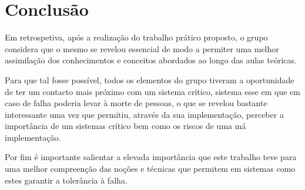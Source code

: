 \chapter*{Conclusão}
\label{cha:conclusao}
Em retrospetiva, após a realização do trabalho prático proposto, o grupo considera que o mesmo se revelou essencial de
modo a permiter uma melhor assimilação dos conhecimentos e conceitos abordados ao longo das aulas teóricas.\par Para que
tal fosse possível, todos os elementos do grupo tiveram a oportunidade de ter um contacto mais próximo com um sistema
crítico, sistema esse em que em caso de falha poderia levar à morte de pessoas, o que se revelou bastante interessante
uma vez que permitiu, através da sua implementação, perceber a importância de um sistemas crítico bem como os riscos de
uma má implementação.\par Por fim é importante salientar a elevada importância que este trabalho teve para uma melhor
compreenção das noções e técnicas que permitem em sistemas como estes garantir a tolerância à falha.
